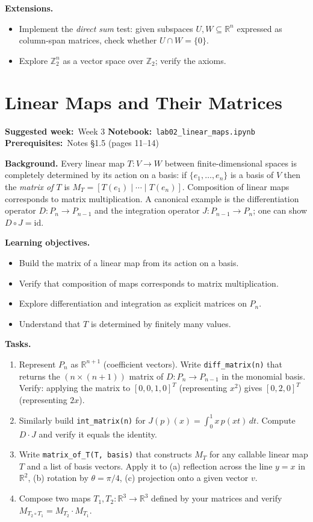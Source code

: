 \documentclass[11pt, a4paper]{article}
\newcommand{\labmeta}[3]{%
  \begin{prereqbox}
  \textbf{Suggested week:}~#1 \quad
  \textbf{Notebook:}~\texttt{#2} \quad
  \textbf{Prerequisites:}~#3
  \end{prereqbox}
  \vspace{4pt}
}
\newcommand{\objectives}[1]{%
  \textbf{\color{prereqcolor}Learning objectives.}\vspace{2pt}
  \begin{itemize}[leftmargin=1.6em, itemsep=1pt] #1 \end{itemize}
}
\newcommand{\tasks}[1]{%
  \begin{taskbox}
  \textbf{\color{taskcolor}Tasks.}
  \begin{enumerate}[leftmargin=1.6em, itemsep=3pt] #1 \end{enumerate}
  \end{taskbox}
}
\newcommand{\extensions}[1]{%
  \textbf{\color{notecolor}Extensions.}
  \begin{itemize}[leftmargin=1.6em, itemsep=1pt] #1 \end{itemize}
}
\begin{document}
\extensions{
  \item Implement the \emph{direct sum} test: given subspaces $U, W \subseteq \mathbb{R}^n$
        expressed as column-span matrices, check whether $U \cap W = \{0\}$.
  \item Explore $\mathbb{Z}_2^n$ as a vector space over $\mathbb{Z}_2$; verify the axioms.
}

\section{Linear Maps and Their Matrices}
\label{lab:linmaps}

\labmeta{Week 3}{lab02\_linear\_maps.ipynb}{Notes §1.5 (pages 11--14)}

\vspace{4pt}

\noindent\textbf{Background.}
Every linear map $T: V \to W$ between finite-dimensional spaces is completely
determined by its action on a basis: if $\{e_1,\ldots,e_n\}$ is a basis of $V$
then the \emph{matrix of $T$} is $M_T = [T(e_1) \mid \cdots \mid T(e_n)]$.
Composition of linear maps corresponds to matrix multiplication.
A canonical example is the differentiation operator $D: P_n \to P_{n-1}$
and the integration operator $J: P_{n-1} \to P_n$; one can show $D \circ J = \mathrm{id}$.

\objectives{
  \item Build the matrix of a linear map from its action on a basis.
  \item Verify that composition of maps corresponds to matrix multiplication.
  \item Explore differentiation and integration as explicit matrices on $P_n$.
  \item Understand that $T$ is determined by finitely many values.
}

\tasks{
  \item Represent $P_n$ as $\mathbb{R}^{n+1}$ (coefficient vectors).
        Write \texttt{diff\_matrix(n)} that returns the $(n \times (n+1))$
        matrix of $D: P_n \to P_{n-1}$ in the monomial basis.
        Verify: applying the matrix to $[0,0,1,0]^T$ (representing $x^2$)
        gives $[0,2,0]^T$ (representing $2x$).
  \item Similarly build \texttt{int\_matrix(n)} for $J(p)(x) = \int_0^1 x\,p(xt)\,dt$.
        Compute $D \cdot J$ and verify it equals the identity.
  \item Write \texttt{matrix\_of\_T(T, basis)} that constructs $M_T$ for any
        callable linear map $T$ and a list of basis vectors.
        Apply it to (a) reflection across the line $y = x$ in $\mathbb{R}^2$,
        (b) rotation by $\theta = \pi/4$, (c) projection onto a given vector $v$.
  \item Compose two maps $T_1, T_2: \mathbb{R}^3 \to \mathbb{R}^3$ defined by your
        matrices and verify $M_{T_2 \circ T_1} = M_{T_2} \cdot M_{T_1}$.
}
\end{document}

